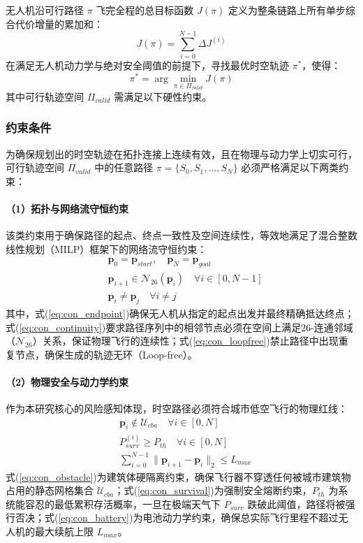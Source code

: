 无人机沿可行路径 $\pi$ 飞完全程的总目标函数 $J(\pi)$ 定义为整条链路上所有单步综合代价增量的累加和：
\begin{equation}
J(\pi) = \sum_{i=0}^{N-1} \Delta J^{(i)}
\end{equation}
在满足无人机动力学与绝对安全阈值的前提下，寻找最优时空轨迹 $\pi^*$，使得：
\begin{equation}
\pi^* = \arg \min_{\pi \in \Pi_{valid}} J(\pi)
\end{equation}
其中可行轨迹空间 $\Pi_{valid}$ 需满足以下硬性约束。

\subsubsection{约束条件}

为确保规划出的时空轨迹在拓扑连接上连续有效，且在物理与动力学上切实可行，可行轨迹空间 $\Pi_{valid}$ 中的任意路径 $\pi = \{S_0, S_1, \dots, S_N\}$ 必须严格满足以下两类约束：

\paragraph{（1）拓扑与网络流守恒约束}
该类约束用于确保路径的起点、终点一致性及空间连续性，等效地满足了混合整数线性规划（MILP）框架下的网络流守恒约束：
\begin{align}
& \mathbf{p}_0 = \mathbf{p}_{start}, \quad \mathbf{p}_N = \mathbf{p}_{goal} \label{eq:con_endpoint} \\
& \mathbf{p}_{i+1} \in \mathcal{N}_{26}(\mathbf{p}_i) \quad \forall i \in [0, N-1] \label{eq:con_continuity} \\
& \mathbf{p}_i \neq \mathbf{p}_j \quad \forall i \neq j \label{eq:con_loopfree}
\end{align}
其中，式(\ref{eq:con_endpoint})确保无人机从指定的起点出发并最终精确抵达终点；式(\ref{eq:con_continuity})要求路径序列中的相邻节点必须在空间上满足26-连通邻域（$\mathcal{N}_{26}$）关系，保证物理飞行的连续性；式(\ref{eq:con_loopfree})禁止路径中出现重复节点，确保生成的轨迹无环（Loop-free）。

\paragraph{（2）物理安全与动力学约束}
作为本研究核心的风险感知体现，时空路径必须符合城市低空飞行的物理红线：
\begin{align}
& \mathbf{p}_i \notin \mathcal{U}_{cba} \quad \forall i \in [0, N] \label{eq:con_obstacle} \\
& P_{surv}^{(i)} \ge P_{th} \quad \forall i \in [0, N] \label{eq:con_survival} \\
& \sum_{i=0}^{N-1} \|\mathbf{p}_{i+1} - \mathbf{p}_i\|_2 \le L_{max} \label{eq:con_battery}
\end{align}
式(\ref{eq:con_obstacle})为建筑体硬隔离约束，确保飞行器不穿透任何被城市建筑物占用的静态网格集合 $\mathcal{U}_{cba}$；式(\ref{eq:con_survival})为强制安全熔断约束，$P_{th}$ 为系统能容忍的最低累积存活概率，一旦在极端天气下 $P_{surv}$ 跌破此阈值，路径将被强行否决；式(\ref{eq:con_battery})为电池动力学约束，确保总实际飞行里程不超过无人机的最大续航上限 $L_{max}$。
